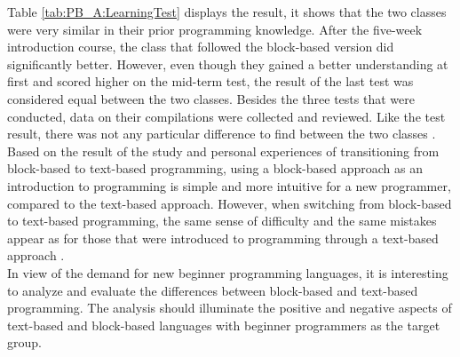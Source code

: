 \begin{table}[H]
\caption{Overview of the average test result for the two different high school classes \cite{FromBlockToText}.}
\label{tab:PB_A:LearningTest}
\end{table}

\noindent
Table \ref{tab:PB_A:LearningTest} displays the result, it shows that the two classes were very similar in their prior programming knowledge. After the five-week introduction course, the class that followed the block-based version did significantly better. However, even though they gained a better understanding at first and scored higher on the mid-term test, the result of the last test was considered equal between the two classes. Besides the three tests that were conducted, data on their compilations were collected and reviewed. Like the test result, there was not any particular difference to find between the two classes \cite{FromBlockToText}. \\

Based on the result of the study \cite{FromBlockToText} and personal experiences of transitioning from block-based to text-based programming, using a block-based approach as an introduction to programming is simple and more intuitive for a new programmer, compared to the text-based approach. However, when switching from block-based to text-based programming, the same sense of difficulty and the same mistakes appear as for those that were introduced to programming through a text-based approach \cite{FromBlockToText}.\\

In view of the demand for new beginner programming languages, it is interesting to analyze and evaluate the differences between block-based and text-based programming. The analysis should illuminate the positive and negative aspects of text-based and block-based languages with beginner programmers as the target group.

